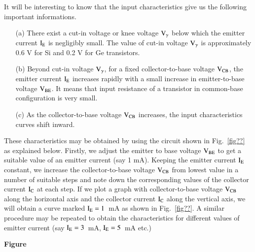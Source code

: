 It will be interesting to know that the input characteristics give us the following important informations.
\begin{itemize}
\item[(a)] There exist a cut-in voltage or knee voltage $\textrm{V}_{\gamma}$ below which the emitter current $\textrm{I}_{\textrm{E}}$ is negligibly small. The value of cut-in voltage $\textrm{V}_{\gamma}$ is approximately 0.6 V for Si and 0.2 V for Ge transistors.

\item[(b)] Beyond cut-in voltage $\textrm{V}_{\gamma}$, for a fixed collector-to-base voltage $\textrm{V}_{\text{CB}}$, the emitter current $\textrm{I}_{\textrm{E}}$ increases rapidly with a small increase in emitter-to-base voltage $\textrm{V}_{\text{BE}}$. It means that input resistance of a transistor in common-base configuration is very small.

\item[(c)] As the collector-to-base voltage $\textrm{V}_{\text{CB}}$ increases, the input characteristics curves shift inward.
\end{itemize}

 These characteristics may be obtained by using the circuit shown in Fig.~\ref{fig??} as explained below. Firstly, we adjust the emitter to base voltage $\textrm{V}_{\text{BE}}$ to get a suitable value of an emitter current (say 1 mA). Keeping the emitter current $\textrm{I}_{\textrm{E}}$ constant, we increase the collector-to-base voltage $\textrm{V}_{\text{CB}}$ from lowest value in a number of suitable steps and note down the corresponding values of the collector current $\textrm{I}_{\textrm{C}}$ at each step. If we plot a graph with collector-to-base voltage $\textrm{V}_{\text{CB}}$ along the horizontal axis and the collector current $\textrm{I}_{\textrm{C}}$ along the vertical axis, we will obtain a curve marked $\textrm{I}_{\textrm{E}}=1$~mA as shown in Fig.~\ref{fig??}. A similar procedure may be repeated to obtain the characteristics for different values of emitter current (say $\textrm{I}_{\textrm{E}}=3$~mA, $\textrm{I}_{\textrm{E}}=5$~mA etc.)
\begin{center}
{\bf Figure}
\end{center}

